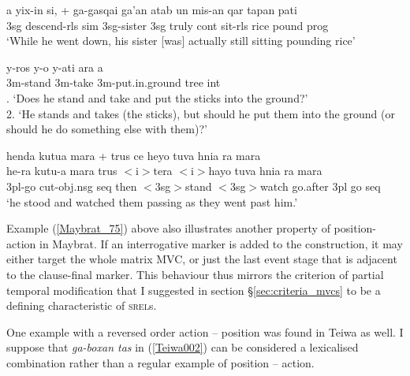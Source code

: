 \ea \label{Teiwa_24}
\gll a yix-in si, + ga-gasqai ga'an atab un mis-an qar tapan pati \\
3\acs{sg} descend-\acs{rls} \acs{sim} 3\acs{sg}-sister 3\acs{sg} truly \acs{cont} sit-\acs{rls} rice pound \acs{prog} \\
\glft `While he went down, his sister [was] actually still sitting pounding rice' \\ 
\z
\xe

\ea \label{Maybrat_75}
\gll y-ros y-o y-ati ara a \\
3\acs{m}-stand 3\acs{m}-take 3\acs{m}-put.in.ground tree \acs{int} \\
. `Does he stand and take and put the sticks into the ground?' \\ 2. `He stands and takes (the sticks), but should he put them into the ground (or should he do something else with them)?' \\ 
\z
\xe

\ea \label{WBW016}
\gll henda kutua mara + trus ce heyo tuva hnia ra mara \\
he-ra kutu-a mara trus $<$i$>$tera $<$i$>$hayo tuva hnia ra mara \\
\glc \acs{3}\acs{pl}-go cut-\acs{obj}.\acs{nsg} \acs{seq} then $<$\acs{3}\acs{sg}$>$stand $<$\acs{3}\acs{sg}$>$watch go.after \acs{3}\acs{pl} go \acs{seq} \\
\glft `he stood and watched them passing as they went past him.' \\ 
\z
\xe

Example (\ref{Maybrat_75}) above also illustrates another property of position-action in Maybrat. If an interrogative marker is added to the construction, it may either target the whole matrix MVC, or just the last event stage that is adjacent to the clause-final marker. This behaviour thus mirrors the criterion of partial temporal modification that I suggested in section §\ref{sec:criteria_mvcs} to be a defining characteristic of \textsc{srel}s.

One example with a reversed order action -- position was found in Teiwa as well. I suppose that \textit{ga-boxan tas} in (\ref{Teiwa002}) can be considered a lexicalised combination rather than a regular example of position -- action.

